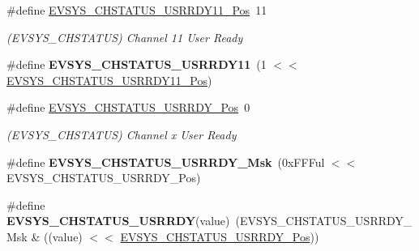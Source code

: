 \begin{DoxyCompactItemize}
\item 
\hypertarget{group___s_a_m_l21___e_v_s_y_s_ga60e1732a2b168f552835675148366176}{}\#define \hyperlink{group___s_a_m_l21___e_v_s_y_s_ga60e1732a2b168f552835675148366176}{E\+V\+S\+Y\+S\+\_\+\+C\+H\+S\+T\+A\+T\+U\+S\+\_\+\+U\+S\+R\+R\+D\+Y11\+\_\+\+Pos}~11\label{group___s_a_m_l21___e_v_s_y_s_ga60e1732a2b168f552835675148366176}

\begin{DoxyCompactList}\small\item\em (E\+V\+S\+Y\+S\+\_\+\+C\+H\+S\+T\+A\+T\+U\+S) Channel 11 User Ready \end{DoxyCompactList}\item 
\hypertarget{group___s_a_m_l21___e_v_s_y_s_ga7373089eeb8cbb75056eaf9024ba72b8}{}\#define {\bfseries E\+V\+S\+Y\+S\+\_\+\+C\+H\+S\+T\+A\+T\+U\+S\+\_\+\+U\+S\+R\+R\+D\+Y11}~(1 $<$$<$ \hyperlink{group___s_a_m_l21___e_v_s_y_s_ga60e1732a2b168f552835675148366176}{E\+V\+S\+Y\+S\+\_\+\+C\+H\+S\+T\+A\+T\+U\+S\+\_\+\+U\+S\+R\+R\+D\+Y11\+\_\+\+Pos})\label{group___s_a_m_l21___e_v_s_y_s_ga7373089eeb8cbb75056eaf9024ba72b8}

\item 
\hypertarget{group___s_a_m_l21___e_v_s_y_s_ga94f145b3b3e74ba31c684f04202e6777}{}\#define \hyperlink{group___s_a_m_l21___e_v_s_y_s_ga94f145b3b3e74ba31c684f04202e6777}{E\+V\+S\+Y\+S\+\_\+\+C\+H\+S\+T\+A\+T\+U\+S\+\_\+\+U\+S\+R\+R\+D\+Y\+\_\+\+Pos}~0\label{group___s_a_m_l21___e_v_s_y_s_ga94f145b3b3e74ba31c684f04202e6777}

\begin{DoxyCompactList}\small\item\em (E\+V\+S\+Y\+S\+\_\+\+C\+H\+S\+T\+A\+T\+U\+S) Channel x User Ready \end{DoxyCompactList}\item 
\hypertarget{group___s_a_m_l21___e_v_s_y_s_ga16a09e90156c8447d3ed7f59699eb3c3}{}\#define {\bfseries E\+V\+S\+Y\+S\+\_\+\+C\+H\+S\+T\+A\+T\+U\+S\+\_\+\+U\+S\+R\+R\+D\+Y\+\_\+\+Msk}~(0x\+F\+F\+Ful $<$$<$ E\+V\+S\+Y\+S\+\_\+\+C\+H\+S\+T\+A\+T\+U\+S\+\_\+\+U\+S\+R\+R\+D\+Y\+\_\+\+Pos)\label{group___s_a_m_l21___e_v_s_y_s_ga16a09e90156c8447d3ed7f59699eb3c3}

\item 
\hypertarget{group___s_a_m_l21___e_v_s_y_s_ga295c34f5c69a2b004da0dd64c3e47168}{}\#define {\bfseries E\+V\+S\+Y\+S\+\_\+\+C\+H\+S\+T\+A\+T\+U\+S\+\_\+\+U\+S\+R\+R\+D\+Y}(value)~(E\+V\+S\+Y\+S\+\_\+\+C\+H\+S\+T\+A\+T\+U\+S\+\_\+\+U\+S\+R\+R\+D\+Y\+\_\+\+Msk \& ((value) $<$$<$ \hyperlink{group___s_a_m_l21___e_v_s_y_s_ga94f145b3b3e74ba31c684f04202e6777}{E\+V\+S\+Y\+S\+\_\+\+C\+H\+S\+T\+A\+T\+U\+S\+\_\+\+U\+S\+R\+R\+D\+Y\+\_\+\+Pos}))\label{group___s_a_m_l21___e_v_s_y_s_ga295c34f5c69a2b004da0dd64c3e47168}


\end{DoxyCompactItemize}
